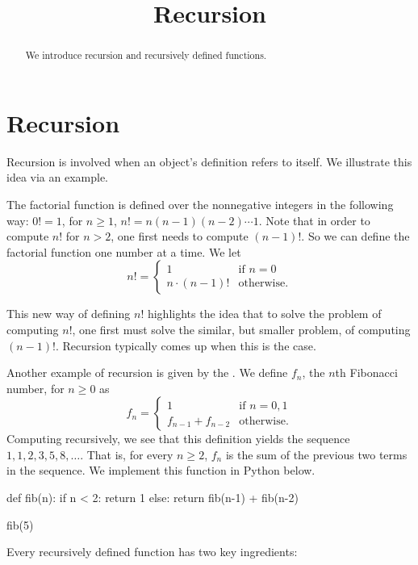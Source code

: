 \documentclass{ximera}
\title{Recursion}
\begin{document}
  
\begin{abstract}  
We introduce recursion and recursively defined functions.
\end{abstract}  
\maketitle

\section{Recursion}

Recursion is involved when an object's definition refers to itself. We illustrate this idea via an example.

The factorial function is defined over the nonnegative integers in the following way: $0!=1$, for $n\geq 1$, $n!=n(n-1)(n-2)\cdots 1$. Note that in order to compute $n!$ for $n>2$, one first needs to compute $(n-1)!$. So we can define the factorial function one number at a time. We let $$n!=\begin{cases} 1 & \text{if $n=0$}\\ n\cdot(n-1)! & \text{otherwise.}\end{cases}$$

This new way of defining $n!$ highlights the idea that to solve the problem of computing $n!$, one first must solve the similar, but smaller problem, of computing $(n-1)!$. Recursion typically comes up when this is the case.

Another example of recursion is given by the . We define $f_n$, the $n$th Fibonacci number, for $n\geq 0$ as $$f_n=\begin{cases} 1 & \text{if $n=0,1$}\\ f_{n-1}+f_{n-2} & \text{otherwise.}\end{cases}$$ Computing recursively, we see that this definition yields the sequence $1,1,2,3,5,8,\dots$. That is, for every $n\geq 2$, $f_n$ is the sum of the previous two terms in the sequence. We implement this function in Python below.

\begin{sageCell}
def fib(n):
        if n < 2:
                return 1
        else:
                return fib(n-1) + fib(n-2)

fib(5)
\end{sageCell}

Every recursively defined function has two key ingredients:
\end{document}
